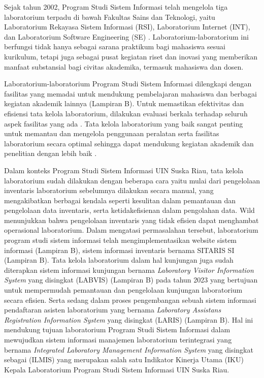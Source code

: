 Sejak tahun 2002, Program Studi Sistem Informasi telah mengelola tiga laboratorium terpadu di bawah Fakultas Sains dan Teknologi, yaitu Laboratorium Rekayasa Sistem Informasi (RSI), Laboratorium Internet (INT), dan Laboratorium Software Engineering (SE) \cite{lab-si-website}. Laboratorium-laboratorium ini berfungsi tidak hanya sebagai sarana praktikum bagi mahasiswa sesuai kurikulum, tetapi juga sebagai pusat kegiatan riset dan inovasi yang memberikan manfaat substansial bagi civitas akademika, termasuk mahasiswa dan dosen.

Laboratorium-laboratorium Program Studi Sistem Informasi dilengkapi dengan fasilitas yang memadai untuk mendukung pembelajaran mahasiswa dan berbagai kegiatan akademik lainnya (Lampiran B). Untuk memastikan efektivitas dan efisiensi tata kelola laboratorium, dilakukan evaluasi berkala terhadap seluruh aspek fasilitas yang ada \cite{lab-si-website}. Tata kelola laboratorium yang baik sangat penting untuk memantau dan mengelola penggunaan peralatan serta fasilitas laboratorium secara optimal sehingga dapat mendukung kegiatan akademik dan penelitian dengan lebih baik \cite{dongapure2024good}.

Dalam konteks Program Studi Sistem Informasi UIN Suska Riau, tata kelola laboratorium sudah dilakukan dengan beberapa cara yaitu mulai dari pengelolaan inventaris laboratorium sebelumnya dilakukan secara manual, yang mengakibatkan berbagai kendala seperti kesulitan dalam pemantauan dan pengelolaan data inventaris, serta ketidakefisienan dalam pengolahan data. Wild \citeyear{smith2021agile} menunjukkan bahwa pengelolaan inventaris yang tidak efisien dapat menghambat operasional laboratorium. Dalam mengatasi permasalahan tersebut, laboratorium program studi sistem informasi telah mengimplementasikan website sistem informasi (Lampiran B), sistem informasi inventaris bernama SITARIS SI (Lampiran B). Tata kelola laboratorium dalam hal kunjungan juga sudah diterapkan sistem informasi kunjungan bernama \textit{Laboratory Visitor Information System} yang disingkat (LABVIS) (Lampiran B) pada tahun 2023 yang bertujuan untuk mempermudah pemantauan dan pengelolaan kunjungan laboratorium secara efisien. Serta sedang dalam proses pengembangan sebuah sistem informasi pendaftaran asisten laboratorium yang bernama \textit{Laboratory Assistans Registration Information System} yang disingkat (LARIS) (Lampiran B). Hal ini mendukung tujuan laboratorium Program Studi Sistem Informasi dalam mewujudkan sistem informasi manajemen laboratorium terintegrasi yang bernama \textit{Integrated Laboratory Management Information System} yang disingkat sebagai (ILMIS) yang merupakan salah satu Indikator Kinerja Utama (IKU) Kepala Laboratorium Program Studi Sistem Informasi UIN Suska Riau.

